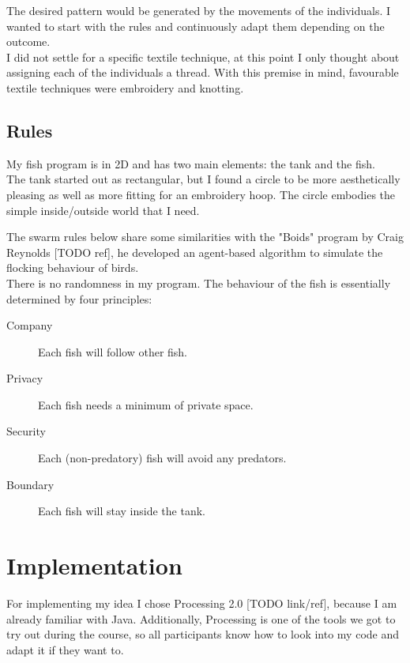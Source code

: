 \documentclass{scrartcl}
\begin{document}
The desired pattern would be generated by the movements of the individuals. I wanted to start with the rules and continuously adapt them depending on the outcome.\\
I did not settle for a specific textile technique, at this point I only thought about assigning each of the individuals a thread. With this premise in mind, favourable textile techniques were embroidery and knotting.


\subsection{Rules}

My fish program is in 2D and has two main elements: the tank and the fish.\\

The tank started out as rectangular, but I found a circle to be more aesthetically pleasing as well as more fitting for an embroidery hoop. The circle embodies the simple inside/outside world that I need.

The swarm rules below share some similarities with the "Boids" program by Craig Reynolds [TODO ref], he developed an agent-based algorithm to simulate the flocking behaviour of birds.\\

There is no randomness in my program. The behaviour of the fish is essentially determined by four principles:\\
\begin{description}
\item[Company] Each fish will follow other fish.
\item[Privacy] Each fish needs a minimum of private space.
\item[Security] Each (non-predatory) fish will avoid any predators.
\item[Boundary] Each fish will stay inside the tank.
\end{description}

\section{Implementation}

For implementing my idea I chose Processing 2.0 [TODO link/ref], because I am already familiar with Java. Additionally, Processing is one of the tools we got to try out during the course, so all participants know how to look into my code and adapt it if they want to.\\
\end{document}
